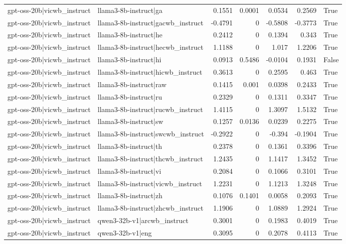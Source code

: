 \begin{table}
\begin{tabular}{l l r r r r l}
gpt-oss-20b|vicwb_instruct & llama3-8b-instruct|ga & 0.1551 & 0.0001 & 0.0534 & 0.2569 & True \\
gpt-oss-20b|vicwb_instruct & llama3-8b-instruct|gacwb_instruct & -0.4791 & 0 & -0.5808 & -0.3773 & True \\
gpt-oss-20b|vicwb_instruct & llama3-8b-instruct|he & 0.2412 & 0 & 0.1394 & 0.343 & True \\
gpt-oss-20b|vicwb_instruct & llama3-8b-instruct|hecwb_instruct & 1.1188 & 0 & 1.017 & 1.2206 & True \\
gpt-oss-20b|vicwb_instruct & llama3-8b-instruct|hi & 0.0913 & 0.5486 & -0.0104 & 0.1931 & False \\
gpt-oss-20b|vicwb_instruct & llama3-8b-instruct|hicwb_instruct & 0.3613 & 0 & 0.2595 & 0.463 & True \\
gpt-oss-20b|vicwb_instruct & llama3-8b-instruct|raw & 0.1415 & 0.001 & 0.0398 & 0.2433 & True \\
gpt-oss-20b|vicwb_instruct & llama3-8b-instruct|ru & 0.2329 & 0 & 0.1311 & 0.3347 & True \\
gpt-oss-20b|vicwb_instruct & llama3-8b-instruct|rucwb_instruct & 1.4115 & 0 & 1.3097 & 1.5132 & True \\
gpt-oss-20b|vicwb_instruct & llama3-8b-instruct|sw & 0.1257 & 0.0136 & 0.0239 & 0.2275 & True \\
gpt-oss-20b|vicwb_instruct & llama3-8b-instruct|swcwb_instruct & -0.2922 & 0 & -0.394 & -0.1904 & True \\
gpt-oss-20b|vicwb_instruct & llama3-8b-instruct|th & 0.2378 & 0 & 0.1361 & 0.3396 & True \\
gpt-oss-20b|vicwb_instruct & llama3-8b-instruct|thcwb_instruct & 1.2435 & 0 & 1.1417 & 1.3452 & True \\
gpt-oss-20b|vicwb_instruct & llama3-8b-instruct|vi & 0.2084 & 0 & 0.1066 & 0.3101 & True \\
gpt-oss-20b|vicwb_instruct & llama3-8b-instruct|vicwb_instruct & 1.2231 & 0 & 1.1213 & 1.3248 & True \\
gpt-oss-20b|vicwb_instruct & llama3-8b-instruct|zh & 0.1076 & 0.1401 & 0.0058 & 0.2093 & True \\
gpt-oss-20b|vicwb_instruct & llama3-8b-instruct|zhcwb_instruct & 1.1906 & 0 & 1.0889 & 1.2924 & True \\
gpt-oss-20b|vicwb_instruct & qwen3-32b-v1|arcwb_instruct & 0.3001 & 0 & 0.1983 & 0.4019 & True \\
gpt-oss-20b|vicwb_instruct & qwen3-32b-v1|eng & 0.3095 & 0 & 0.2078 & 0.4113 & True \\

\end{tabular}
\end{table}
